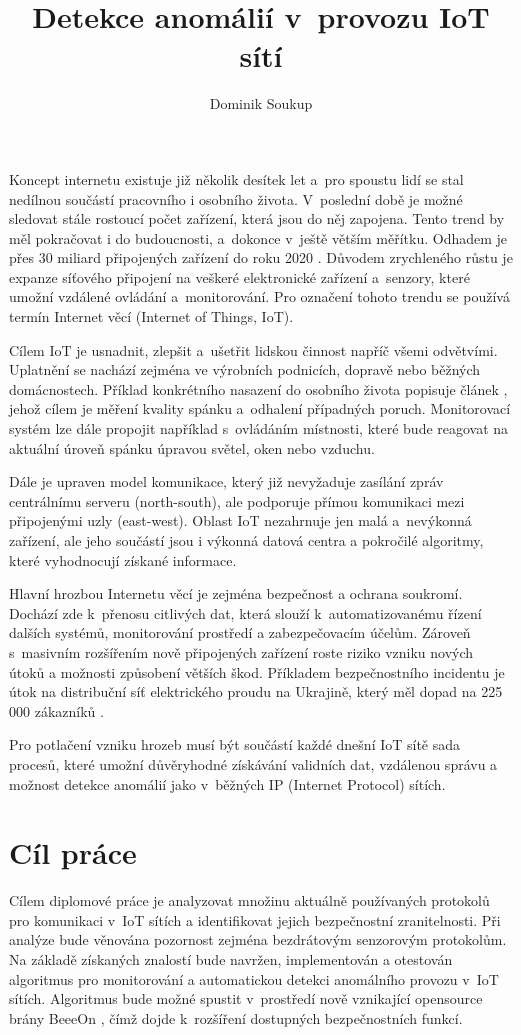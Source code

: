 \documentclass[thesis=M,czech]{FITthesis}[2012/06/26]
\title{Detekce anomálií v~provozu IoT sítí}
\author{Dominik Soukup}
\begin{document}
\begin{introduction}
Koncept internetu existuje již několik desítek let a~pro spoustu lidí se stal 
nedílnou součástí pracovního i osobního života. V~poslední době je možné sledovat
stále rostoucí počet zařízení, která jsou do něj zapojena. Tento trend by měl
pokračovat i do budoucnosti, a~dokonce v~ještě větším měřítku. Odhadem je 
přes 30 miliard připojených zařízení do roku 2020 \cite{iotDevices}.
Důvodem zrychleného
růstu je expanze síťového připojení na veškeré elektronické zařízení a~senzory, 
které umožní vzdálené ovládání a~monitorování. Pro označení tohoto trendu se používá
termín Internet věcí (Internet of Things, IoT).

Cílem IoT je usnadnit, zlepšit a~ušetřit lidskou činnost napříč všemi odvětvími. 
Uplatnění se nachází zejména ve výrobních podnicích, dopravě nebo běžných domácnostech.
Příklad konkrétního nasazení do osobního života popisuje článek \cite{sleeping}, jehož cílem je měření 
kvality spánku a~odhalení případných poruch. Monitorovací systém lze dále 
propojit například s~ovládáním místnosti, které bude reagovat na aktuální úroveň spánku
úpravou světel, oken nebo vzduchu.

Dále je upraven model komunikace, který již nevyžaduje zasílání zpráv centrálnímu 
serveru (north-south), ale podporuje přímou komunikaci mezi připojenými uzly (east-west).
Oblast IoT nezahrnuje jen malá a~nevýkonná zařízení, ale jeho součástí jsou i 
výkonná datová centra a pokročilé algoritmy, které vyhodnocují získané informace.

Hlavní hrozbou Internetu věcí je zejména bezpečnost a ochrana soukromí. Dochází zde k~přenosu
citlivých dat, která slouží
k~automatizovanému řízení dalších
systémů, monitorování prostředí a zabezpečovacím účelům. Zároveň s~masivním rozšířením nově
připojených zařízení roste riziko vzniku nových útoků a možnosti způsobení větších
škod. Příkladem bezpečnostního incidentu je útok na distribuční síť elektrického 
proudu na Ukrajině, který měl dopad na 225 000 zákazníků \cite{ukraine}. 

Pro potlačení vzniku hrozeb musí být součástí každé dnešní IoT sítě sada procesů,
které umožní důvěryhodné
získávání validních dat, vzdálenou správu a možnost
detekce anomálií jako v~běžných IP (Internet Protocol) sítích.

\section{Cíl práce}
Cílem diplomové práce je analyzovat množinu aktuálně používaných protokolů
pro komunikaci v~IoT sítích a identifikovat jejich bezpečnostní zranitelnosti.
Při analýze bude věnována pozornost zejména bezdrátovým senzorovým protokolům.
Na základě získaných znalostí bude navržen, implementován a otestován algoritmus
pro monitorování a automatickou detekci anomálního provozu v~IoT sítích.
Algoritmus bude možné spustit
v~prostředí nově vznikající opensource brány BeeeOn \cite{beeeon}, čímž dojde k~rozšíření 
dostupných bezpečnostních funkcí.
\end{introduction}
\end{document}
